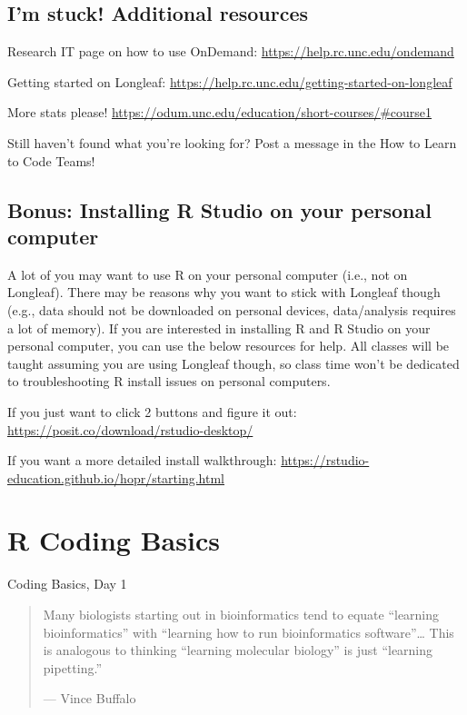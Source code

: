 \documentclass[
  letterpaper,
  DIV=11,
  numbers=noendperiod]{scrreprt}
\begin{document}
\hypertarget{im-stuck-additional-resources}{%
\section{I'm stuck! Additional
resources}\label{im-stuck-additional-resources}}

Research IT page on how to use OnDemand:
\url{https://help.rc.unc.edu/ondemand}

Getting started on Longleaf:
\url{https://help.rc.unc.edu/getting-started-on-longleaf}

More stats please!
\url{https://odum.unc.edu/education/short-courses/\#course1}

Still haven't found what you're looking for? Post a message in the How
to Learn to Code Teams!

\hypertarget{bonus-installing-r-studio-on-your-personal-computer}{%
\section{Bonus: Installing R Studio on your personal
computer}\label{bonus-installing-r-studio-on-your-personal-computer}}

A lot of you may want to use R on your personal computer (i.e., not on
Longleaf). There may be reasons why you want to stick with Longleaf
though (e.g., data should not be downloaded on personal devices,
data/analysis requires a lot of memory). If you are interested in
installing R and R Studio on your personal computer, you can use the
below resources for help. All classes will be taught assuming you are
using Longleaf though, so class time won't be dedicated to
troubleshooting R install issues on personal computers.

If you just want to click 2 buttons and figure it out:
\url{https://posit.co/download/rstudio-desktop/}

If you want a more detailed install walkthrough:
\url{https://rstudio-education.github.io/hopr/starting.html}


\hypertarget{r-coding-basics}{%
\chapter{R Coding Basics}\label{r-coding-basics}}

Coding Basics, Day 1

\hfill\break

\begin{quote}
Many biologists starting out in bioinformatics tend to equate ``learning
bioinformatics'' with ``learning how to run bioinformatics
software''\ldots{} This is analogous to thinking ``learning molecular
biology'' is just ``learning pipetting.''

--- Vince Buffalo
\end{quote}
\end{document}

